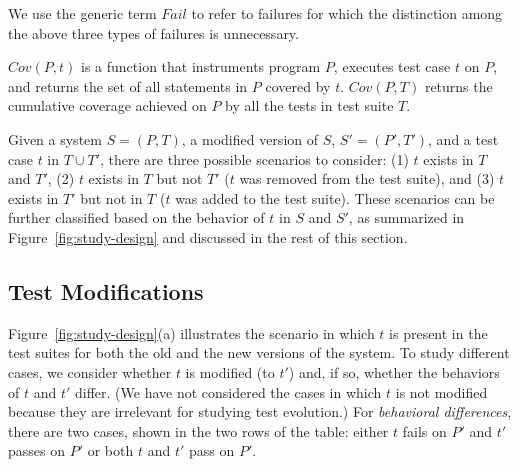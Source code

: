 \documentclass[conference]{IEEEtran}
\newcommand{\mt}{\mathit}
\newcommand{\fail}{\mt{Fail}}
\newcommand{\covfunc}[2]{\mt{Cov(#1, #2)}}
\begin{document}
We use the generic term $\fail$ to refer to failures for which the
distinction among the above three types of failures is unnecessary.

$\covfunc{P}{t}$ is a function that instruments program $P$, executes
test case $t$ on $P$, and returns the set of all statements in $P$
covered by $t$. $\covfunc{P}{T}$ returns the cumulative coverage
achieved on $P$ by all the tests in test suite $T$.



Given a system $S = (P, T)$, a modified version of $S$, $S'=(P', T')$,
and a test case $t$ in $T \cup T'$, there are three possible scenarios
to consider: (1) $t$ exists in $T$ and $T'$, (2) $t$ exists in $T$ but
not $T'$ (\ie $t$ was removed from the test suite), and (3) $t$ exists
in $T'$ but not in $T$ (\ie $t$ was added to the test suite). These
scenarios can be further classified based on the behavior of $t$ in
$S$ and $S'$, as summarized in Figure~\ref{fig:study-design} and
discussed in the rest of this section.

\subsection{Test Modifications}
\label{sec:test-mod}

Figure~\ref{fig:study-design}(a) illustrates the scenario in which $t$
is present in the test suites for both the old and the new versions of
the system. To study different cases, we consider whether $t$ is
modified (to $t'$) and, if so, whether the behaviors of $t$ and $t'$
differ. (We have not considered the cases in which $t$ is not modified
because they are irrelevant for studying test evolution.)  For
\textit{behavioral differences}, there are two cases, shown in the two
rows of the table: either $t$ fails on $P'$ and $t'$ passes on $P'$ or
both $t$ and $t'$ pass on $P'$.
\end{document}
